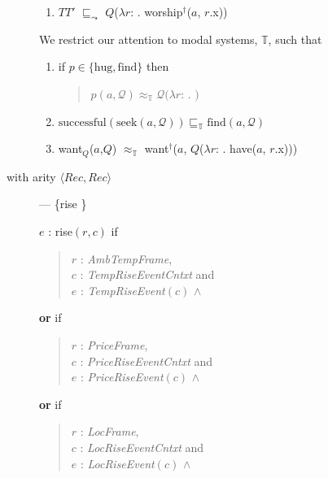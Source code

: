 \begin{description}
\begin{description}
\begin{enumerate}
\item $T$\fbox{\d{$\wedge$}}$T'$ $\sqsubseteq_{\leadsto}$ $Q$($\lambda
  r$:
  . worship$^\dagger$($a$, $r$.x)) 

\end{enumerate}

\bigskip

    We restrict our attention to modal systems, $\mathbb{T}$, such
    that
    \begin{enumerate}
    
    \item if $p\in\{\text{hug},\text{find}\}$ then
    \begin{quote}
      $p(a,\mathcal{Q})\approx_{\mathbb{T}}\mathcal{Q}(\lambda
      r$: . $)$
    \end{quote}
    
    
    
  \item $\text{successful}(\text{seek}(a,\mathcal{Q}))\sqsubseteq_{\mathbb{T}}
    \text{find}(a,\mathcal{Q})$

    
  \item want$_Q$($a$,$Q$) $\approx_{\mathbb{T}}$
want$^\dagger$($a$, $Q$($\lambda
r$: . have($a$, $r$.x)))
\end{enumerate}
  

    \item[with arity
  \textnormal{$\langle\textit{Rec},\textit{Rec}\rangle$}] --- \{rise
  \}
  

      $e$ : rise$(r,c)$ if
  \begin{quote}
    $r$ : \textit{AmbTempFrame},\\
    $c$ : \textit{TempRiseEventCntxt} and \\
    $e$ : \textit{TempRiseEvent}$(c)$ \d{$\wedge$}
  \end{quote}
  \textbf{or} if
  \begin{quote}
    $r$ : \textit{PriceFrame},\\
    $c$ : \textit{PriceRiseEventCntxt} and \\
    $e$ : \textit{PriceRiseEvent}$(c)$ \d{$\wedge$}
  \end{quote}
  \textbf{or} if
  \begin{quote}
    $r$ : \textit{LocFrame},\\
    $c$ : \textit{LocRiseEventCntxt} and \\
    $e$ : \textit{LocRiseEvent}$(c)$ \d{$\wedge$}
  \end{quote}


\end{description}
\end{description}
